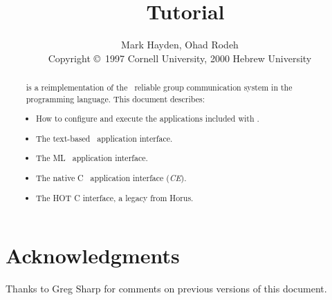 \documentclass[11pt]{article}
\title{\ensemble\ Tutorial}
\author{Mark Hayden, Ohad Rodeh \\
\small{Copyright \copyright\ 1997 Cornell University,
                             2000 Hebrew  University}
}
\begin{document}
\maketitle

\begin{abstract}
\ensemble\ is a reimplementation of the \horus\ reliable group communication
system in the \caml\ programming language.  This document describes:
\begin{itemize}
\item
How to configure and execute the applications included with \ensemble.
\item
The text-based \ensemble\ application interface.
\item
The ML \ensemble\ application interface.
\item
The native C \ensemble\ application interface ({\it CE}).
\item 
The HOT C interface, a legacy from Horus.
\end{itemize}
\end{abstract}

\newpage
\tableofcontents
\newpage




%









\section*{Acknowledgments}
Thanks to Greg Sharp for comments on previous versions of this document.
\end{document}
